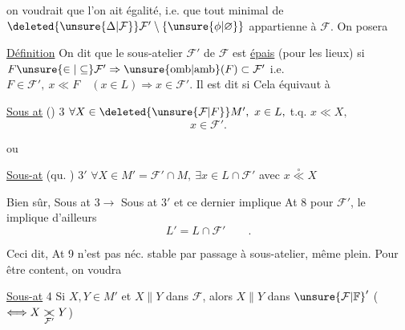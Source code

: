
on voudrait que l'on ait égalité, i.e. que tout  minimal de $\deleted{\unsure{\Delta|\mathcal F}}\mathcal F'\setminus\{\unsure{\phi|\varnothing}\}$  appartienne à $\mathcal F$. On posera

\uline{Définition} On dit que le sous-atelier $\mathcal F'$ de $\mathcal F$ est \uline{épais} (pour les lieux) si $F\unsure{\in|\subseteq}\mathcal F'\Rightarrow\unsure{\mathrm{omb}|\mathrm{amb}}(F)\subset\mathcal F'$ i.e. $F\in\mathcal F',\ x\ll F\quad(x\in L)\Rightarrow x\in\mathcal F'$. Il est dit   si  Cela équivaut à

\uline{Sous at} () 3 $\forall X\in\deleted{\unsure{\mathcal F|F}}M',\ x\in L,$ t.q. $x\ll X,$
\[
x\in\mathcal F'.
\]

 ou


\uline{Sous-at} (qu. ) $3'$ $\forall X\in M'=\mathcal F'\cap M,\ \exists x\in L\cap\mathcal F'$ avec $x\overset{\circ}{\ll} X$

Bien sûr, Sous at $3\to$ Sous at $3'$ et ce dernier implique At 8 pour $\mathcal F'$,  le  implique d'ailleurs
\[
L'=L\cap\mathcal F'\qquad .
\]

Ceci dit, At 9 n'est pas néc. stable par passage à sous-atelier, même plein. Pour être content, on voudra

\uline{Sous-at} 4 Si $X,Y\in M'$ et $X\parallel Y$ dans $\mathcal F$, alors $X\parallel Y$ dans $ {\unsure{\mathcal F|\mathbb F}}'$ ($\Longleftrightarrow X\mathrel{\underset{\mathcal F'}{\mathord{\rlap{$>$}<}}}Y$)
